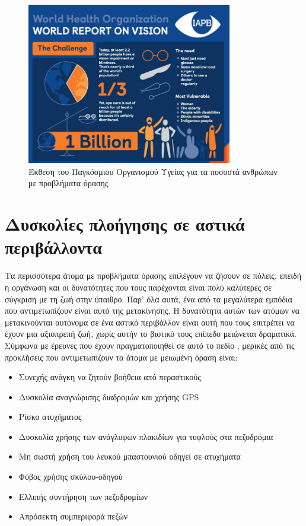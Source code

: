 \begin{figure}[H]
    \centering
    \includegraphics[width=0.8\textwidth]{images/who_stats.JPG}
    \caption{Έκθεση του Παγκόσμιου Οργανισμού Υγείας για τα ποσοστά ανθρώπων με προβλήματα όρασης \cite{Whatexac14:online}}
    \label{fig:who-stats}
\end{figure}

\section{Δυσκολίες πλοήγησης σε αστικά περιβάλλοντα}
Τα περισσότερα άτομα με προβλήματα όρασης επιλέγουν να ζήσουν σε πόλεις, επειδή η οργάνωση και οι δυνατότητες που τους παρέχονται είναι πολύ καλύτερες σε σύγκριση με τη ζωή στην ύπαιθρο. Παρ' όλα αυτά, ένα από τα μεγαλύτερα εμπόδια που αντιμετωπίζουν είναι αυτό της μετακίνησης. Η δυνατότητα αυτών των ατόμων να μετακινούνται αυτόνομα σε ένα αστικό περιβάλλον είναι αυτή που τους επιτρέπει να έχουν μια αξιοπρεπή ζωή, χωρίς αυτήν το βιοτικό τους επίπεδο μειώνεται δραματικά. Σύμφωνα με έρευνες που έχουν πραγματοποιηθεί σε αυτό το πεδίο \cite{riazi_outdoor_2016,parkin2012blind-needs}, μερικές από τις προκλήσεις που αντιμετωπίζουν τα άτομα με μειωμένη όραση είναι:
\begin{itemize}
    \item Συνεχής ανάγκη να ζητούν βοήθεια από περαστικούς
    \item Δυσκολία αναγνώρισης διαδρομών και χρήσης GPS
    \item Ρίσκο ατυχήματος
    \item Δυσκολία χρήσης των ανάγλυφων πλακιδίων για τυφλούς στα πεζοδρόμια
    \item Μη σωστή χρήση του λευκού μπαστουνιού οδηγεί σε ατυχήματα
    \item Φόβος χρήσης σκύλου-οδηγού
    \item Ελλιπής συντήρηση των πεζοδρομίων
    \item Απρόσεκτη συμπεριφορά πεζών
\end{itemize}

